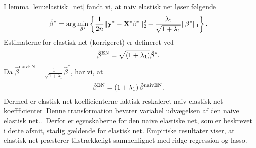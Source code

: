 I lemma \ref{lem:elastisk_net} fandt vi, at naiv elastisk net løser følgende 
\begin{align}
\hat{\beta}^* = \arg \min_{\beta^*} \cbr{\frac{1}{2n} \Vert \y^* - \X^* \beta^* \Vert_2^2 + \frac{\lambda_2}{\sqrt{1+\lambda_1}} \Vert \beta^* \Vert_1}. \label{eq:EN8}
\end{align}
Estimaterne for elastisk net (korrigeret) er defineret ved
\begin{align*}
\hat{\beta}^\text{EN} = \sqrt{\del{1+\lambda_1}} \hat{\beta}^*.
\end{align*}
Da \(\hat{\beta}^\text{naivEN} = \frac{1}{\sqrt{1+\lambda_1}} \hat{\beta}^*\), har vi, at
\begin{align*}
\hat{\beta}^\text{EN} = \del{1+\lambda_1} \hat{\beta}^\text{naivEN}.
\end{align*}
Dermed er elastisk net koefficienterne faktisk reskaleret naiv elastisk net koeffficienter.
Denne transformation bevarer variabel udvægelsen af den naive elastisk net...
Derfor er egenskaberne for den naive elastiske net, som er beskrevet i dette afsnit, stadig gældende for elastisk net.
Empiriske resultater viser, at elastisk net præsterer tilstrækkeligt sammenlignet med ridge regression og lasso.


